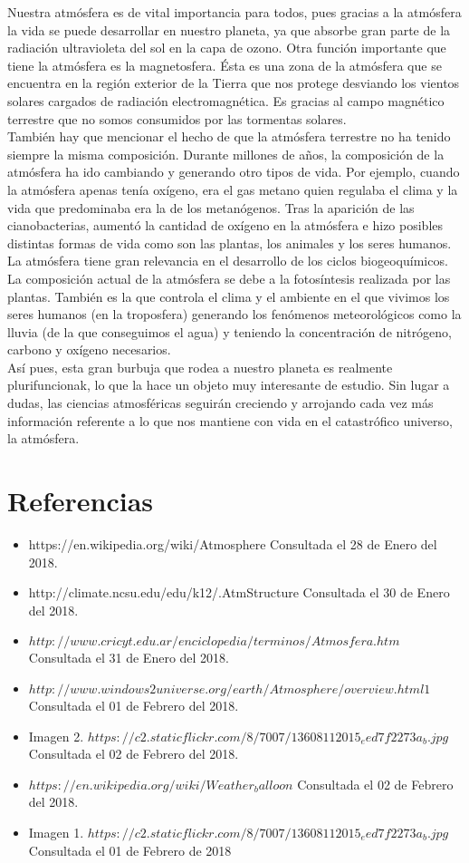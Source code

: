 \documentclass{article}
\begin{document}
\begin{doublespace}
Nuestra atmósfera es de vital importancia para todos, pues gracias a la atmósfera la vida se puede desarrollar en nuestro planeta, ya que absorbe gran parte de la radiación ultravioleta del sol en la capa de ozono. Otra función importante que tiene la atmósfera es la magnetosfera. Ésta es una zona de la atmósfera que se encuentra en la región exterior de la Tierra que nos protege desviando los vientos solares cargados de radiación electromagnética. Es gracias al campo magnético terrestre que no somos consumidos por las tormentas solares. 
\\
También hay que mencionar el hecho de que la atmósfera terrestre no ha tenido siempre la misma composición. Durante millones de años, la composición de la atmósfera ha ido cambiando y generando otro tipos de vida. Por ejemplo, cuando la atmósfera apenas tenía oxígeno, era el gas metano quien regulaba el clima y la vida que predominaba era la de los metanógenos. Tras la aparición de las cianobacterias, aumentó la cantidad de oxígeno en la atmósfera e hizo posibles distintas formas de vida como son las plantas, los animales y los seres humanos.
\\
La atmósfera tiene gran relevancia en el desarrollo de los ciclos biogeoquímicos. La composición actual de la atmósfera se debe a la fotosíntesis realizada por las plantas. También es la que controla el clima y el ambiente en el que vivimos los seres humanos (en la troposfera) generando los fenómenos meteorológicos como la lluvia (de la que conseguimos el agua) y teniendo la concentración de nitrógeno, carbono y oxígeno necesarios.
\\
Así pues, esta gran burbuja que rodea a nuestro planeta es realmente plurifuncionak, lo que la hace un objeto muy interesante de estudio. Sin lugar a dudas, las ciencias atmosféricas seguirán creciendo y arrojando cada vez más información referente a lo que nos mantiene con vida en el catastrófico universo, la atmósfera. 

\section*{Referencias}
\begin{itemize}
    \item https://en.wikipedia.org/wiki/Atmosphere Consultada el 28 de Enero del 2018.
    \item http://climate.ncsu.edu/edu/k12/.AtmStructure Consultada el 30 de Enero del 2018.
    \item $http://www.cricyt.edu.ar/enciclopedia/terminos/Atmosfera.htm$ Consultada el 31 de Enero del 2018.
    \item $http://www.windows2universe.org/earth/Atmosphere/overview.html1$ Consultada el 01 de Febrero del 2018.
    \item Imagen 2. $https://c2.staticflickr.com/8/7007/13608112015_eed7f2273a_b.jpg$ Consultada el 02 de Febrero del 2018.
    \item $https://en.wikipedia.org/wiki/Weather_balloon$ Consultada el 02 de Febrero del 2018.
    \item Imagen 1. $https://c2.staticflickr.com/8/7007/13608112015_eed7f2273a_b.jpg$ Consultada el 01 de Febrero de 2018
  

\end{itemize}
\end{doublespace}
\end{document}
